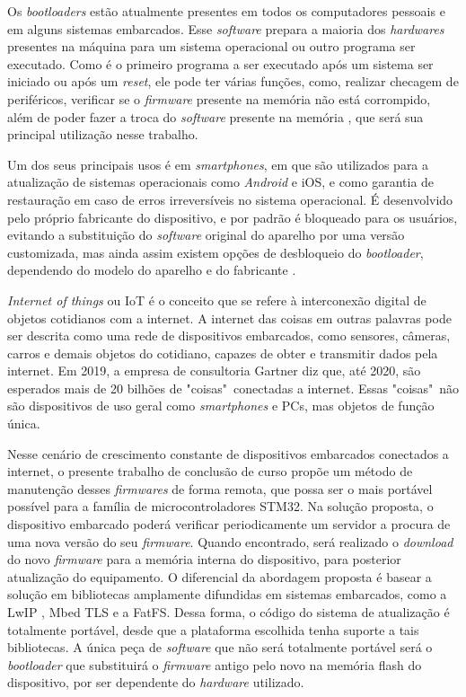 Os \textit{bootloaders} estão atualmente presentes em todos os computadores pessoais e em alguns sistemas embarcados. Esse \textit{software} prepara a maioria dos \textit{hardwares} presentes na máquina para um sistema operacional ou outro programa ser executado.
Como é o primeiro programa a ser executado após um sistema ser iniciado ou após um \textit{reset}, ele pode ter várias funções, como, realizar checagem de periféricos, verificar se o \textit{firmware} presente na memória não está corrompido, além de poder fazer a troca do \textit{software} presente na memória \cite{DavesDurlin2013}, que será sua principal utilização nesse trabalho.

Um dos seus principais usos é em \textit{smartphones}, em que são utilizados para a atualização de sistemas operacionais como \textit{Android} e iOS, e como garantia de restauração em caso de erros irreversíveis no sistema operacional. É desenvolvido pelo próprio fabricante do dispositivo, e por padrão é bloqueado para os usuários, evitando a substituição do \textit{software} original do aparelho por uma versão customizada, mas ainda assim existem opções de desbloqueio do \textit{bootloader}, dependendo do modelo do aparelho e do fabricante \cite{Salute2018}.%

\textit{Internet of things} ou IoT é o conceito que se refere à interconexão digital de objetos cotidianos com a internet. A internet das coisas em outras palavras pode ser descrita como uma rede de dispositivos embarcados, como sensores, câmeras, carros e demais objetos do cotidiano, capazes de obter e transmitir dados pela internet. Em 2019, a empresa de consultoria Gartner \cite{Gartner} diz que, até 2020, são esperados mais de 20 bilhões de "coisas"\  conectadas a internet. Essas "coisas"\  não são dispositivos de uso geral como \textit{smartphones} e PCs, mas objetos de função única.

Nesse cenário de crescimento constante de dispositivos embarcados conectados a internet, o presente trabalho de conclusão de curso propõe um método de manutenção desses \textit{firmwares} de forma remota, que possa ser o mais portável possível para a família de microcontroladores STM32.
Na solução proposta, o dispositivo embarcado poderá verificar periodicamente um servidor a procura de uma nova versão do seu \textit{firmware}. Quando encontrado, será realizado o \textit{download} do novo \textit{firmware} para a memória interna do dispositivo, para posterior atualização do equipamento. O diferencial da abordagem proposta é basear a solução em bibliotecas amplamente difundidas em sistemas embarcados, como a LwIP \cite{LWIP}, Mbed TLS \cite{mbedtls} e a FatFS\cite{FATFS}. Dessa forma, o código do sistema de atualização é totalmente portável, desde que a plataforma escolhida tenha suporte a tais bibliotecas. A única peça de \textit{software} que não será totalmente portável será o \textit{bootloader} que substituirá o \textit{firmware} antigo pelo novo na memória flash do dispositivo, por ser dependente do \textit{hardware} utilizado.

